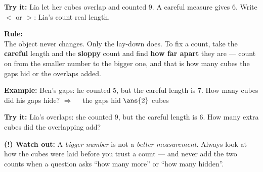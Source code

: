\documentclass[12pt]{article}
\begin{document}
\begin{tryitbox}
\textbf{Try it:} \quad Lia let her cubes overlap and counted 9. A careful measure gives 6.
Write $<$ or $>$: Lia's count \underline{\hspace{1.2cm}} real length.\\[2pt]
\end{tryitbox}


\begin{formulabox}
\textbf{Rule:}\\[3pt]
The object never changes. Only the lay-down does. To fix a count, take the
\textbf{careful} length and the \textbf{sloppy} count and find \textbf{how far apart}
they are --- count on from the smaller number to the bigger one, and that is how many
cubes the gaps hid or the overlaps added.
\end{formulabox}

\begin{examplebox}
\textbf{Example:} \quad Ben's gaps: he counted 5, but the careful length is 7. How many
cubes did his gaps hide?
$\Rightarrow\quad$ the gaps hid $\ans{2}$ cubes
\end{examplebox}

\begin{tryitbox}
\textbf{Try it:} \quad Lia's overlaps: she counted 9, but the careful length is 6. How
many extra cubes did the overlapping add?\\[2pt]
\end{tryitbox}

\begin{watchoutbox}
\textbf{(!) Watch out:} A \emph{bigger number} is not a \emph{better measurement}. Always
look at how the cubes were laid before you trust a count --- and never add the two counts
when a question asks ``how many more'' or ``how many hidden''.
\end{watchoutbox}
\end{document}
